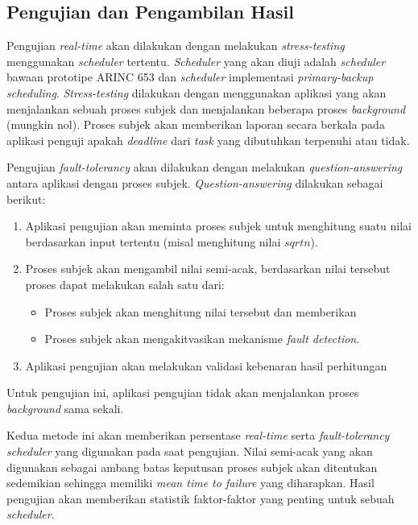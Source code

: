 \subsection{Pengujian dan Pengambilan Hasil}

Pengujian \textit{real-time} akan dilakukan dengan melakukan \textit{stress-testing} menggunakan \textit{scheduler} tertentu.
\textit{Scheduler} yang akan diuji adalah \textit{scheduler} bawaan prototipe ARINC 653 dan \textit{scheduler} implementasi \textit{primary-backup scheduling}.
\textit{Stress-testing} dilakukan dengan menggunakan aplikasi yang akan menjalankan sebuah proses subjek dan menjalankan beberapa proses \textit{background} (mungkin nol).
Proses subjek akan memberikan laporan secara berkala pada aplikasi penguji apakah \textit{deadline} dari \textit{task} yang dibutuhkan terpenuhi atau tidak.

Pengujian \textit{fault-tolerancy} akan dilakukan dengan melakukan \textit{question-answering} antara aplikasi dengan proses subjek.
\textit{Question-answering} dilakukan sebagai berikut:
\begin{enumerate}
    \item Aplikasi pengujian akan meminta proses subjek untuk menghitung suatu nilai berdasarkan input tertentu (misal menghitung nilai $sqrt{n}$).
    \item Proses subjek akan mengambil nilai semi-acak, berdasarkan nilai tersebut proses dapat melakukan salah satu dari:
        \begin{itemize}
            \item Proses subjek akan menghitung nilai tersebut dan memberikan
            \item Proses subjek akan mengakitvasikan mekanisme \textit{fault detection}.
        \end{itemize}
    \item Aplikasi pengujian akan melakukan validasi kebenaran hasil perhitungan
\end{enumerate}
Untuk pengujian ini, aplikasi pengujian tidak akan menjalankan proses \textit{background} sama sekali.

Kedua metode ini akan memberikan persentase \textit{real-time} serta \textit{fault-tolerancy} \textit{scheduler} yang digunakan pada saat pengujian.
Nilai semi-acak yang akan digunakan sebagai ambang batas keputusan proses subjek akan ditentukan sedemikian sehingga memiliki \textit{mean time to failure} yang diharapkan.
Hasil pengujian akan memberikan statistik faktor-faktor yang penting untuk sebuah \textit{scheduler}.


